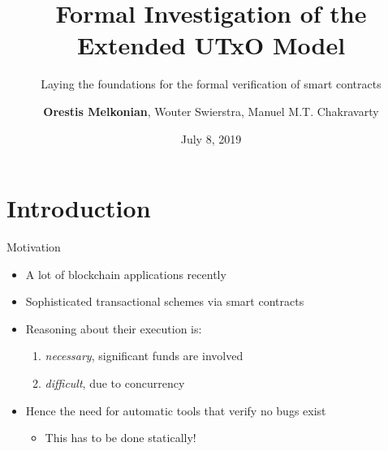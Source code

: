 \documentclass[aspectratio=43]{beamer}
\title{Formal Investigation of the Extended UTxO Model}
\subtitle{Laying the foundations for the formal verification of smart contracts}
\author{\textbf{Orestis Melkonian}, Wouter Swierstra, Manuel M.T. Chakravarty}
\date{July 8, 2019}
\renewcommand\alert[1]{\textcolor{mLightBrown}{#1}}
\begin{document}
\begin{center}
\maketitle
{}
\end{center}

\section{Introduction}

\begin{frame}{Motivation}
\begin{itemize}
\item A lot of blockchain applications recently
\item Sophisticated transactional schemes via \alert{smart contracts}
\item Reasoning about their execution is:
  \begin{enumerate}
  \item \textit{necessary}, significant funds are involved
  \item \textit{difficult}, due to concurrency
  \end{enumerate}
\item Hence the need for automatic tools that verify no bugs exist
  \begin{itemize}
  \item This has to be done \alert{statically}!
  \end{itemize}
\end{itemize}
\end{frame}
\end{document}
